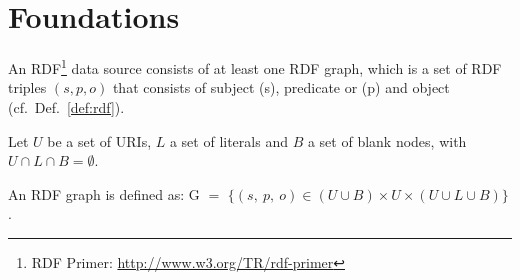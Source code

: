 \documentclass{llncs} %
\newcommand{\ggr}[1]{\textcolor{magenta}{comment Gerd: \textit{#1}}}
\begin{document}
%
%
%
%
%



\section{Foundations}


An RDF\footnote{RDF Primer: \url{http://www.w3.org/TR/rdf-primer}} data source consists of at least one RDF graph, which is a set of RDF triples $(s, p, o)$
that consists of subject (s), predicate or (p)  and object (cf.~Def.~\ref{def:rdf}).

\begin{definition}
\label{def:rdf}
Let $U$ be a set of URIs, $L$  a set of literals and $B$ a set of blank nodes,
with $U \cap L \cap B = \emptyset$.

An RDF graph is defined as:
$\mathrm{G}$ $=$ $\{ (s ,\ p , \ o) \in (U\cup B)\times U \times (U\cup L \cup B) \} $. 
\end{definition}
\end{document}
